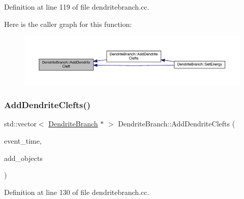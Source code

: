 Definition at line 119 of file dendritebranch.\+cc.

Here is the caller graph for this function\+:\nopagebreak
\begin{figure}[H]
\begin{center}
\leavevmode
\includegraphics[width=350pt]{class_dendrite_branch_a060f0c55b2e6cb65b68e160df0bbf563_icgraph}
\end{center}
\end{figure}
\mbox{\label{class_dendrite_branch_a2ddeff41db805e414c994ac169cbcf4b}} 
\subsubsection{\texorpdfstring{Add\+Dendrite\+Clefts()}{AddDendriteClefts()}}
{\footnotesize\ttfamily std\+::vector$<$ \hyperlink{class_dendrite_branch}{Dendrite\+Branch} $\ast$ $>$ Dendrite\+Branch\+::\+Add\+Dendrite\+Clefts (\begin{DoxyParamCaption}\item[{std\+::chrono\+::time\+\_\+point$<$ \hyperlink{universe_8h_a0ef8d951d1ca5ab3cfaf7ab4c7a6fd80}{Clock} $>$}]{event\+\_\+time,  }\item[{std\+::vector$<$ \hyperlink{class_dendrite_branch}{Dendrite\+Branch} $\ast$$>$}]{add\+\_\+objects }\end{DoxyParamCaption})}



Definition at line 130 of file dendritebranch.\+cc.

